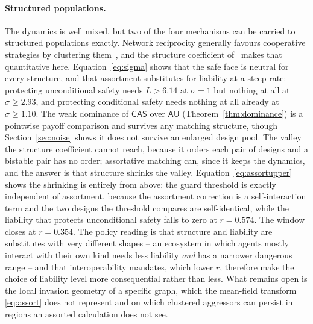 \documentclass[pdflatex]{sn-jnl}
\theoremstyle{thmstyleone}
\theoremstyle{thmstylethree}
\theoremstyle{thmstyletwo}
\newcommand{\AU}{\textsf{AU}}
\newcommand{\CAS}{\textsf{CAS}}
\begin{document}
\paragraph{Structured populations.}
The dynamics is well mixed, but two of the four mechanisms can be carried to
structured populations exactly. Network reciprocity generally favours
cooperative strategies by clustering them~\citep{ohtsuki2006simple,santos2006structured}, and the structure
coefficient of~\citet{tarnita2009strategy} makes that quantitative here.
Equation~\eqref{eq:sigma} shows that the safe face is neutral for every
structure, and that assortment substitutes for liability at a steep rate:
protecting unconditional safety needs $L>6.14$ at $\sigma=1$ but nothing at
all at $\sigma\ge2.93$, and protecting conditional safety needs nothing at all
already at $\sigma\ge1.10$. The weak dominance of $\CAS$ over $\AU$
(Theorem~\ref{thm:dominance}) is a pointwise payoff comparison and survives
any matching structure, though Section~\ref{sec:noise} shows it does not
survive an enlarged design pool. The valley the structure coefficient cannot
reach, because it orders each pair of designs and a bistable pair has no
order; assortative matching can, since it keeps the dynamics, and the answer
is that structure shrinks the valley. Equation~\eqref{eq:assortupper} shows
the shrinking is entirely from above: the guard threshold is exactly
independent of assortment, because the assortment correction is a
self-interaction term and the two designs the threshold compares are
self-identical, while the liability that protects unconditional safety falls
to zero at $r=0.574$. The window closes at $r=0.354$. The policy reading is
that structure and liability are substitutes with very different shapes -- an
ecosystem in which agents mostly interact with their own kind needs less
liability \emph{and} has a narrower dangerous range -- and that interoperability
mandates, which lower $r$, therefore make the choice of liability level more
consequential rather than less. What remains open is the local invasion
geometry of a specific graph, which the mean-field transform
\eqref{eq:assort} does not represent and on which clustered aggressors can
persist in regions an assorted calculation does not see.
\end{document}
